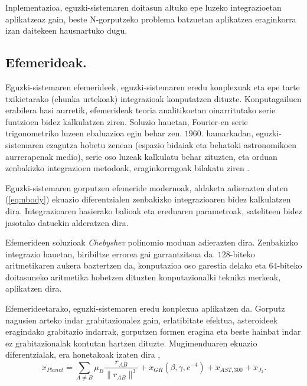 Inplementazioa, eguzki-sistemaren doitasun altuko epe luzeko integrazioetan aplikatzeaz gain, beste N-gorputzeko problema batzuetan aplikatzea eraginkorra izan daitekeen hausnartuko dugu. 

\subsection*{Efemerideak.}

Eguzki-sistemaren  efemerideek, eguzki-sistemaren eredu konplexuak eta epe tarte txikietarako (ehunka urtekoak) integrazioak konputatzen dituzte. Konputagailuen erabilera hasi aurretik, efemerideak teoria analitikoetan oinarritutako serie funtzioen bidez kalkulatzen ziren. Soluzio hauetan, Fourier-en serie trigonometriko luzeen ebaluazioa egin behar zen. $1960.$ hamarkadan, eguzki-sistemaren ezagutza hobetu zenean (espazio bidaiak eta behatoki astronomikoen aurrerapenak medio), serie oso luzeak kalkulatu behar zituzten, eta orduan zenbakizko integrazioen metodoak, eraginkorragoak bilakatu ziren \cite{Kaplan2015}.   
   
Eguzki-sistemaren gorputzen efemeride modernoak, aldaketa adierazten duten (\ref{eq:nbody})  ekuazio diferentzialen  zenbakizko integrazioaren bidez kalkulatzen dira. Integrazioaren hasierako balioak eta ereduaren parametroak, sateliteen bidez jasotako datuekin alderatzen dira.

Efemerideen soluzioak \emph{Chebyshev} polinomio moduan adierazten dira. Zenbakizko integrazio hauetan, biribiltze errorea gai garrantzitsua da. $128$-biteko aritmetikaren aukera baztertzen da, konputazioa oso garestia delako eta $64$-biteko doitasuneko aritmetika hobetzen dituzten  konputazionalki teknika merkeak, aplikatzen dira. 

Efemerideetarako, eguzki-sistemaren eredu konplexua aplikatzen da. Gorputz nagusien arteko indar grabitazionalez gain, erlatibitate efektua, asteroideek eragindako grabitazio indarrak, gorputzen formen eragina eta beste hainbat indar ez grabitazionalak kontutan hartzen dituzte. Mugimenduaren ekuazio diferentzialak, era honetakoak izaten dira \cite{Feinga2015},      
      \begin{equation*}
      \ddot{x}_{Planet}= \sum_{A \neq B} \mu_B \frac{r_{AB}}{\|r_{AB}\|^3}+\ddot{x}_{GR} (\beta,\gamma,c^{-4})+ \ddot{x}_{AST,300}+ \ddot{x}_{J_2}.
      \end{equation*}

